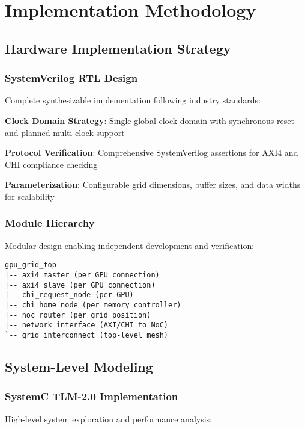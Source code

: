 \documentclass[11pt,a4paper]{article}
\begin{document}
\section{Implementation Methodology}

\subsection{Hardware Implementation Strategy}

\subsubsection{SystemVerilog RTL Design}
Complete synthesizable implementation following industry standards:

\begin{techlist}
    \item \textbf{Clock Domain Strategy}: Single global clock domain with synchronous reset and planned multi-clock support
    \item \textbf{Protocol Verification}: Comprehensive SystemVerilog assertions for AXI4 and CHI compliance checking
    \item \textbf{Parameterization}: Configurable grid dimensions, buffer sizes, and data widths for scalability
\end{techlist}

\subsubsection{Module Hierarchy}
Modular design enabling independent development and verification:

\begin{verbatim}
gpu_grid_top
|-- axi4_master (per GPU connection)
|-- axi4_slave (per GPU connection)
|-- chi_request_node (per GPU)
|-- chi_home_node (per memory controller)
|-- noc_router (per grid position)
|-- network_interface (AXI/CHI to NoC)
`-- grid_interconnect (top-level mesh)
\end{verbatim}

\subsection{System-Level Modeling}

\subsubsection{SystemC TLM-2.0 Implementation}
High-level system exploration and performance analysis:
\end{document}
